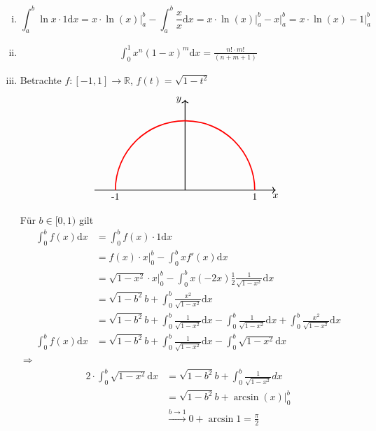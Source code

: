 \begin{enumerate}[(i)]
	\item 
	\[
		\int_{a} ^{b} \! \ln x \cdot 1  \mathrm{d}x  = x \cdot \ln(x) \Big|_a^b - \int_{a} ^{b} \! \frac{x}{x}  \mathrm{d}x = x \cdot \ln(x) \Big|_a^b - x\Big|_a^b
		= x \cdot \ln(x) -1 \Big|_a^b 
	\]
	\item 
	\begin{align*}
		\int_{0} ^{1} \! x^n (1-x)^m  \mathrm{d}x  = \frac{n! \cdot m!}{(n+m+1)} \tag{Übung!} 
	\end{align*}
	\item Betrachte $f : [-1,1] \to \mathds{R}$, $f(t) = \sqrt{1-t^2} $
	\[
		\begin{tikzpicture}[scale=2.5]
			\draw [->, thick] (-1.3,0)-- (1.3,0) node [below] {$x$};
			\draw [->, thick] (0,0)-- (0,1.3) node [left]{$y$};
			\draw [very thick, red](1,0) arc [radius=1, start angle = 0, end angle = 180];
			\node [below] at (1,0) {1};
			\node [below] at (-1,0) {-1};
		\end{tikzpicture}
	\]
	Für $b \in [0,1)$ gilt 
	\begin{align*}
		\int_{0} ^{b} \! f(x)  \mathrm{d}x &= \int_{0} ^{b} \! f(x) \cdot 1  \mathrm{d}x  \\
		&= f(x) \cdot x \Big|_{0}^{b} - \int_{0} ^{b} \! x f'(x)  \mathrm{d}x \\
		&= \sqrt{1-x^2} \cdot x \Big|_{0}^b - \int_{0} ^{b} \! x(-2x) \frac{1}{2} \frac{1}{\sqrt{1- x^2} }  \mathrm{d}x \\
		&=    \sqrt{1-b^2}b + \int_{0} ^{b} \! \frac{x^2}{\sqrt{1-x^2} }  \mathrm{d}x   \\
		&= \sqrt{1-b^2} b + \int_{0}^{b} \! \frac{1}{\sqrt{1-x^2} }  \mathrm{d}x   - \int_{0}^{b} \! \frac{1}{\sqrt{1-x^2} }  \mathrm{d}x  
		+ \int_{0} ^{b} \! \frac{x^2}{\sqrt{1-x^2} }  \mathrm{d}x   \\
		\int_{0} ^{b} \! f(x)  \mathrm{d}x &= \sqrt{1-b^2} b + \int_{0} ^{b} \! \frac{1}{\sqrt{1-x^2} }  \mathrm{d}x  - \int_{0} ^{b} \! \sqrt{1-x^2}  \mathrm{d}x    
	\end{align*}
	$\Rightarrow $
	\begin{align*}
		2 \cdot \int_{0} ^{b} \! \sqrt{1-x^2}  \mathrm{d}x &= \sqrt{1-b^2} b + \int_{0} ^{b} \! \frac{1}{\sqrt{1-x^2} } dx   \\
		&= \sqrt{1-b^2} b + \arcsin(x) \Big|_0^b \tag{12.7} \\
		&\xrightarrow{b \to 1} 0 + \arcsin 1 = \frac{\pi}{2} \tag{Hälfte des Einheitskreises} 
	\end{align*}
\end{enumerate}


\cleardoubleoddemptypage
{}
\setcounter{page}{1}
\printindex
\listoffigures
